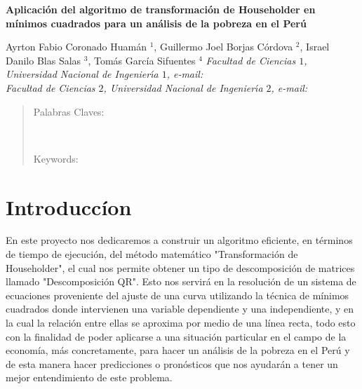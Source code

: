 \documentclass[twocolumn,twoside]{article}
\begin{document}
\begin{center}
 {\Large \textbf{Aplicaci\'on del algoritmo de transformaci\'on de Householder en m\'inimos cuadrados para un an\'alisis 
 de la pobreza en el Per\'u}}
\end{center}
\begin{center}
 Ayrton Fabio Coronado Huam\'an $^1$, Guillermo Joel Borjas C\'ordova $^2$,
 Israel Danilo Blas Salas $^3$, Tom\'as Garc\'ia Sifuentes $^4$ \vskip12pt
{\it Facultad de Ciencias $1$, Universidad Nacional de Ingenier\'{\i}a $1$, e-mail: \\
Facultad de Ciencias $2$, Universidad Nacional de Ingenier\'{\i}a $2$, e-mail:  }
\end{center}
\begin{quotation}
{\small

Palabras Claves:  
}\\
{\small
\hspace*{0.5cm} 

Keywords: \\ 
}
\end{quotation}

\section{Introducc\'ion}

En este proyecto nos dedicaremos a construir un algoritmo eficiente, en t\'erminos de
tiempo de ejecuci\'on, del m\'etodo matemático "Transformación de Householder", el cual
nos permite obtener un tipo de descomposici\'on de matrices llamado "Descomposici\'on QR".
Esto nos servir\'a en la resoluci\'on de un sistema de ecuaciones proveniente del ajuste de
una curva utilizando la t\'ecnica de m\'inimos cuadrados donde intervienen una variable 
dependiente y una independiente, y en la cual la relaci\'on entre ellas se aproxima por medio
de una l\'inea recta, todo esto con la finalidad de poder aplicarse a una situaci\'on 
particular en el campo de la economía, m\'as concretamente, para hacer un an\'alisis de la 
pobreza en el Per\'u y de esta manera hacer predicciones o pronósticos que nos ayudarán a 
tener un mejor entendimiento de este problema.\\
\end{document}
